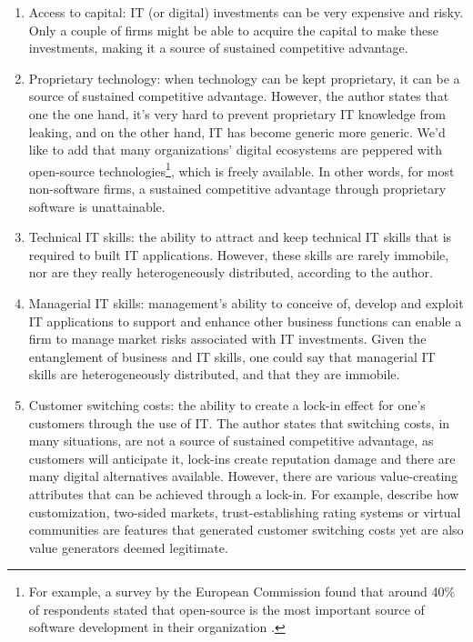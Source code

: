 \documentclass[12pt]{article}
\providecommand{\tightlist}{%
  \setlength{\itemsep}{0pt}\setlength{\parskip}{0pt}}
\begin{document}
\begin{enumerate}
\def\labelenumi{\arabic{enumi}.}
\tightlist
\item
  Access to capital: IT (or digital) investments can be very expensive
  and risky. Only a couple of firms might be able to acquire the capital
  to make these investments, making it a source of sustained competitive
  advantage.
\item
  Proprietary technology: when technology can be kept proprietary, it
  can be a source of sustained competitive advantage. However, the
  author states that one the one hand, it's very hard to prevent
  proprietary IT knowledge from leaking, and on the other hand, IT has
  become generic more generic. We'd like to add that many organizations'
  digital ecosystems are peppered with open-source
  technologies\footnote{For example, a survey by the European Commission
    found that around 40\% of respondents stated that open-source is the
    most important source of software development in their organization
    \citep[ 191]{ec2021}.}, which is freely available. In other words,
  for most non-software firms, a sustained competitive advantage through
  proprietary software is unattainable.
\item
  Technical IT skills: the ability to attract and keep technical IT
  skills that is required to built IT applications. However, these
  skills are rarely immobile, nor are they really heterogeneously
  distributed, according to the author.
\item
  Managerial IT skills: management's ability to conceive of, develop and
  exploit IT applications to support and enhance other business
  functions can enable a firm to manage market risks associated with IT
  investments. Given the entanglement of business and IT skills, one
  could say that managerial IT skills are heterogeneously distributed,
  and that they are immobile.
\item
  Customer switching costs: the ability to create a lock-in effect for
  one's customers through the use of IT. The author states that
  switching costs, in many situations, are not a source of sustained
  competitive advantage, as customers will anticipate it, lock-ins
  create reputation damage and there are many digital alternatives
  available. However, there are various value-creating attributes that
  can be achieved through a lock-in. For example,
  \citet[505-507]{amit2001} describe how customization, two-sided
  markets, trust-establishing rating systems or virtual communities are
  features that generated customer switching costs yet are also value
  generators deemed legitimate.
\end{enumerate}
\end{document}
